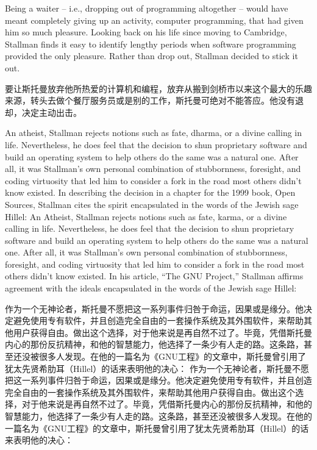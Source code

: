 \ifdefined\eng
Being a waiter -- i.e., dropping out of programming altogether -- would have meant completely giving up an activity, computer programming, that had given him so much pleasure. Looking back on his life since moving to Cambridge, Stallman finds it easy to identify lengthy periods when software programming provided the only pleasure. Rather than drop out, Stallman decided to stick it out.
\fi

\ifdefined\chs
要让斯托曼放弃他所热爱的计算机和编程，放弃从搬到剑桥市以来这个最大的乐趣来源，转头去做个餐厅服务员或是别的工作，斯托曼可绝对不能答应。他没有退却，决定主动出击。
\fi

\ifdefined\eng
\ifdefined\vone
An atheist, Stallman rejects notions such as fate, dharma, or a divine calling in life. Nevertheless, he does feel that the decision to shun proprietary software and build an operating system to help others do the same was a natural one. After all, it was Stallman's own personal combination of stubbornness, foresight, and coding virtuosity that led him to consider a fork in the road most others didn't know existed. In describing the decision in a chapter for the 1999 book, Open Sources, Stallman cites the spirit encapsulated in the words of the Jewish sage Hillel:
\fi
\ifdefined\vtwo
An Atheist, Stallman rejects notions such as fate, karma, or a divine calling in life. Nevertheless, he does feel that the decision to shun proprietary software and build an operating system to help others do the same was a natural one. After all, it was Stallman's own personal combination of stubbornness, foresight, and coding virtuosity that led him to consider a fork in the road most others didn't know existed. In his article, ``The GNU Project,'' Stallman affirms agreement with the ideals encapsulated in the words of the Jewish sage Hillel:
\fi
\fi

\ifdefined\chs
\ifdefined\vone
作为一个无神论者，斯托曼不愿把这一系列事件归咎于命运，因果或是缘分。他决定避免使用专有软件，并且创造完全自由的一套操作系统及其外围软件，来帮助其他用户获得自由。做出这个选择，对于他来说是再自然不过了。毕竟，凭借斯托曼内心的那份反抗精神，和他的智慧能力，他选择了一条少有人走的路。这条路，甚至还没被很多人发现。在他的一篇名为《GNU工程》的文章中，斯托曼曾引用了犹太先贤希肋耳（Hillel）的话来表明他的决心：
\fi
\ifdefined\vtwo
作为一个无神论者，斯托曼不愿把这一系列事件归咎于命运，因果或是缘分。他决定避免使用专有软件，并且创造完全自由的一套操作系统及其外围软件，来帮助其他用户获得自由。做出这个选择，对于他来说是再自然不过了。毕竟，凭借斯托曼内心的那份反抗精神，和他的智慧能力，他选择了一条少有人走的路。这条路，甚至还没被很多人发现。在他的一篇名为《GNU工程》的文章中，斯托曼曾引用了犹太先贤希肋耳（Hillel）的话来表明他的决心：
\fi
\fi

